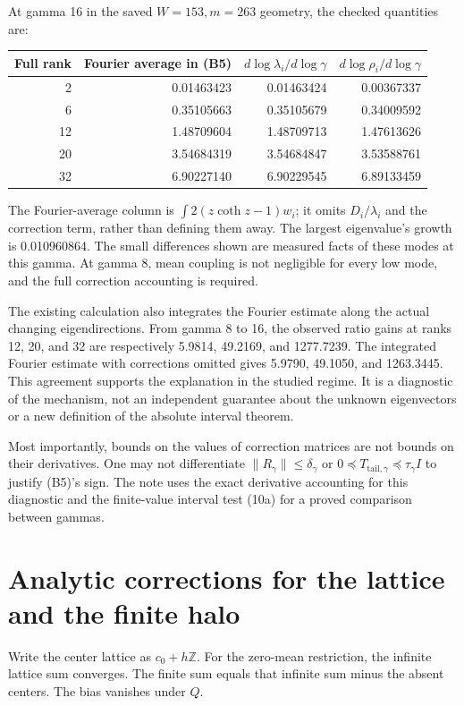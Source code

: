 \documentclass[11pt]{article}
\begin{document}
At gamma 16 in the saved \(W=153,m=263\) geometry, the checked quantities are:
\begin{center}\small
\begin{tabular}{rrrr}
\toprule
Full rank & Fourier average in (B5) & \(d\log\lambda_i/d\log\gamma\) & \(d\log\rho_i/d\log\gamma\)\\
\midrule
2  & 0.01463423 & 0.01463424 & 0.00367337\\
6  & 0.35105663 & 0.35105679 & 0.34009592\\
12 & 1.48709604 & 1.48709713 & 1.47613626\\
20 & 3.54684319 & 3.54684847 & 3.53588761\\
32 & 6.90227140 & 6.90229545 & 6.89133459\\
\bottomrule
\end{tabular}
\end{center}
The Fourier-average column is \(\int 2(z\coth z-1)w_i\); it omits \(D_i/\lambda_i\) and the correction term, rather than defining them away. The largest eigenvalue's growth is 0.010960864. The small differences shown are measured facts of these modes at this gamma. At gamma 8, mean coupling is not negligible for every low mode, and the full correction accounting is required.

The existing calculation also integrates the Fourier estimate along the actual changing eigendirections. From gamma 8 to 16, the observed ratio gains at ranks 12, 20, and 32 are respectively 5.9814, 49.2169, and 1277.7239. The integrated Fourier estimate with corrections omitted gives 5.9790, 49.1050, and 1263.3445. This agreement supports the explanation in the studied regime. It is a diagnostic of the mechanism, not an independent guarantee about the unknown eigenvectors or a new definition of the absolute interval theorem.

Most importantly, bounds on the values of correction matrices are not bounds on their derivatives. One may not differentiate \(\|R_\gamma\|\le\delta_\gamma\) or \(0\preceq T_{\mathrm{tail},\gamma}\preceq\tau_\gamma I\) to justify (B5)'s sign. The note uses the exact derivative accounting for this diagnostic and the finite-value interval test (10a) for a proved comparison between gammas.

\section{Analytic corrections for the lattice and the finite halo}

Write the center lattice as \(c_0+h\mathbb Z\). For the zero-mean restriction, the infinite lattice sum converges. The finite sum equals that infinite sum minus the absent centers. The bias vanishes under \(Q\).
\end{document}

